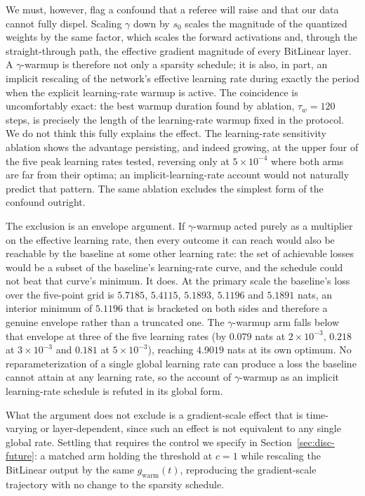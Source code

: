 \documentclass[final,5p,times,twocolumn]{elsarticle}
\theoremstyle{remark}
\begin{document}
We must, however, flag a confound that a referee will raise and that our data
cannot fully dispel. Scaling $\gamma$ down by $s_0$ scales the magnitude of the
quantized weights by the same factor, which scales the forward activations and,
through the straight-through path, the effective gradient magnitude of every
BitLinear layer. A $\gamma$-warmup is therefore not only a sparsity
schedule; it is also, in part, an implicit rescaling of the network's effective
learning rate during exactly the period when the explicit learning-rate warmup
is active. The coincidence is uncomfortably exact: the best warmup duration
found by ablation, $\tau_w = 120$ steps, is precisely the length of the
learning-rate warmup fixed in the protocol. We do not think this fully explains
the effect. The learning-rate sensitivity ablation shows the advantage
persisting, and indeed growing, at the upper four of the five peak learning
rates tested, reversing only at $5\times 10^{-4}$ where both arms are far from
their optima; an implicit-learning-rate account would not naturally predict
that pattern. The same ablation excludes the simplest form of the confound
outright.

The exclusion is an envelope argument. If $\gamma$-warmup acted purely as a
multiplier on the effective learning rate, then every outcome it can reach
would also be reachable by the baseline at some other learning rate: the set of
achievable losses would be a subset of the baseline's learning-rate curve, and
the schedule could not beat that curve's minimum. It does. At the primary
scale the baseline's loss over the five-point grid is $5.7185$, $5.4115$,
$5.1893$, $5.1196$ and $5.1891$ nats, an interior minimum of $5.1196$ that is
bracketed on both sides and therefore a genuine envelope rather than a
truncated one. The $\gamma$-warmup arm falls below that envelope at three of
the five learning rates (by $0.079$ nats at $2\times 10^{-3}$, $0.218$ at
$3\times 10^{-3}$ and $0.181$ at $5\times 10^{-3}$), reaching $4.9019$ nats at
its own optimum. No reparameterization of a single global learning rate can
produce a loss the baseline cannot attain at any learning rate, so the
account of $\gamma$-warmup as an implicit learning-rate schedule is refuted
in its global form.

What the argument does not exclude is a gradient-scale effect that is
time-varying or layer-dependent, since such an effect is not equivalent to any
single global rate. Settling that requires the control we specify in
Section~\ref{sec:disc-future}: a matched arm holding the threshold at $c = 1$
while rescaling the BitLinear output by the same $g_{\mathrm{warm}}(t)$,
reproducing the gradient-scale trajectory with no change to the sparsity
schedule.
\end{document}

